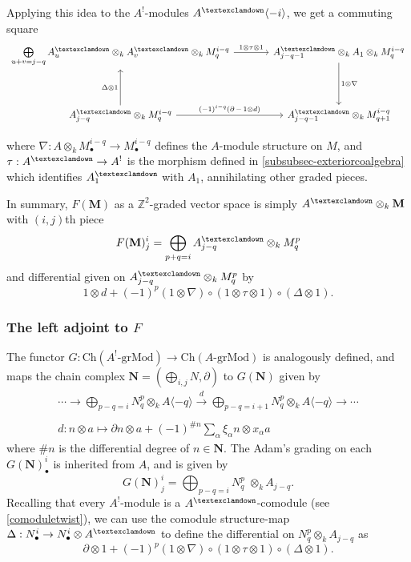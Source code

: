 \documentclass[a4paper]{article}
\theoremstyle{definition}
\theoremstyle{remark}
\newcommand{\grMod}{\ensuremath{\text{-grMod}}}
\newcommand{\Ch}{\ensuremath{\text{Ch}}}
\newcommand{\gnab}{{\textexclamdown}}
\begin{document}
Applying this idea to the \(A^!\)-modules \(A^\gnab\langle -i \rangle\), we get
a commuting square
\[\begin{tikzcd}[column sep=large, row sep=huge]  
    \bigoplus\limits_{u+v=j-q}A^\gnab_{u} \otimes_k A^\gnab_v \otimes_k
    M^{i-q}_q 
    \arrow[r, "1\otimes \tau \otimes 1"]
    & A^\gnab_{j-q-1} \otimes_k A_1 \otimes_k M^{i-q}_{q} 
    \arrow[d, "1\otimes \nabla"] \\
    A^\gnab_{j-q} \otimes_k M^{i-q}_q
    \arrow[u, "\Delta \otimes 1"] 
    \arrow[r, "(-1)^{i-q}(\partial \,- \,1\otimes d)"]
    &A^\gnab_{j-q-1} \otimes_k M^{i-q}_{q+1}
\end{tikzcd}\]

where \(\nabla: A\otimes_k M^{i-q}_\bullet \rightarrow M^{i-q}_\bullet\) defines the
\(A\)-module structure on \(M\), and \(\tau:A^\gnab \rightarrow A^!\) is the
morphism defined in \cref{subsubsec-exteriorcoalgebra} which identifies
\(A^\gnab_1\) with \(A_{1}\), annihilating other graded pieces. 

In summary, \(F(\mathbf{M})\) as a \(\mathbb{Z}^2\)-graded vector space is
simply \(A^\gnab \otimes_{k} \mathbf{M}\)  with \((i,j)\)th piece
\[F(\mathbf{M})^i_j = \bigoplus_{p+q=i}A^\gnab_{j-q}\otimes_k M^p_q\]
and differential given on \(A^\gnab_{j-q}\otimes_k M^p_q\) by 
\[1\otimes d + (-1)^{p}(1\otimes \nabla)\circ (1\otimes \tau \otimes
1)\circ(\Delta\otimes 1).\]

\subsubsection{The left adjoint to \(F\)}

The functor \(G:\Ch(A^!\grMod)\rightarrow \Ch(A\grMod)\) is analogously defined,
and maps the chain complex \(\mathbf{N}=(\bigoplus_{i,j}N, \partial)\) to \(G(\mathbf{N})\) given by
\begin{gather*}
    \cdots \rightarrow \bigoplus_{p-q=i} N^p_q \otimes_k A\langle -q \rangle
    \xrightarrow{\;d\;} \bigoplus_{p-q=i+1}N^p_q \otimes_k A\langle -q \rangle
    \rightarrow \cdots \\ \\
    d: n\otimes a \longmapsto \partial n\otimes a + (-1)^{\#n} \sum_\alpha
    \xi_\alpha n \otimes x_\alpha a
\end{gather*}
where \(\#n\) is the differential degree of \(n\in \mathbf{N}\). The Adam's
grading on each \(G(\mathbf{N})^i_\bullet\) is inherited from \(A\), and is
given by
\[G(\mathbf{N})^i_j =   \bigoplus_{p-q=i}N^p_q \; \otimes_k A_{j-q}.\]
Recalling that every \(A^!\)-module is a \(A^\gnab\)-comodule (see
\cref{comoduletwist}), we can use the comodule structure-map \(\Delta: N^i_\bullet
\rightarrow N^i_\bullet \otimes A^\gnab \) to define the differential on
\(N^p_q\otimes_k A_{j-q}\) as
\[\partial \otimes 1 + (-1)^{p}(1\otimes \nabla)\circ (1\otimes \tau \otimes
1)\circ(\Delta \otimes 1).\]
\end{document}
